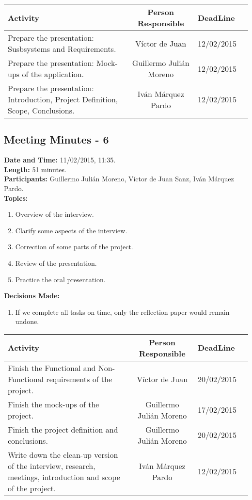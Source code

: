 \begin{tabular}{|p{5cm} | c|p{5cm}| p{2cm}|}
\hline Activity & Person Responsible & DeadLine \\\hline
Prepare the presentation: Susbsystems and Requirements. & Víctor de Juan & 12/02/2015\\\hline

Prepare the presentation: Mock-ups of the application. & Guillermo Julián Moreno & 12/02/2015\\\hline

Prepare the presentation: Introduction, Project Definition, Scope, Conclusions. & Iván Márquez Pardo & 12/02/2015\\\hline
\end{tabular}


\subsection{Meeting Minutes - 6}
\textbf{Date and Time:} 11/02/2015, 11:35. \\
\textbf{Length:} 51 minutes. \\
\textbf{Participants: } Guillermo Julián Moreno, Víctor de Juan Sanz, Iván Márquez Pardo.\\

\textbf{Topics: } 
\begin{enumerate}
\item Overview of the interview.
\item Clarify some aspects of the interview.
\item Correction of some parts of the project.
\item Review of the presentation.
\item Practice the oral presentation.
\end{enumerate}

\textbf{Decisions Made:}\\
\begin{enumerate}
\item If we complete all tasks on time, only the reflection paper would remain undone.
\end{enumerate}

\begin{tabular}{|p{5cm} | c|p{5cm}| p{2cm}|}
\hline Activity & Person Responsible & DeadLine \\\hline
Finish the Functional and Non-Functional requirements of the project. & Víctor de Juan & 20/02/2015\\\hline

Finish the mock-ups of the project. & Guillermo Julián Moreno & 17/02/2015\\\hline

Finish the project definition and conclusions. & Guillermo Julián Moreno & 20/02/2015\\\hline

Write down the clean-up version of the interview, research, meetings, introduction and scope of the project. & Iván Márquez Pardo & 12/02/2015\\\hline
\end{tabular}